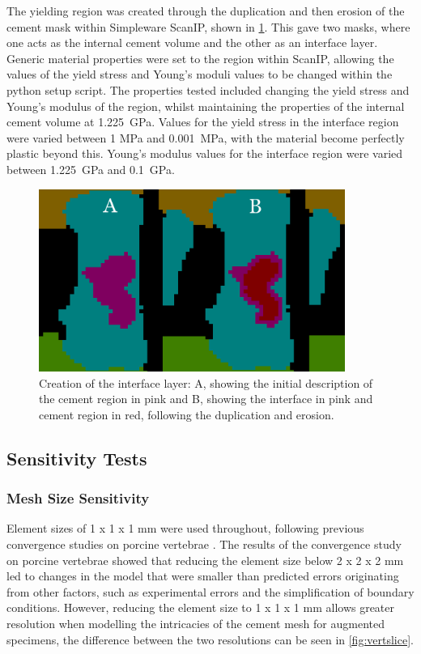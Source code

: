 The yielding region was created through the duplication and then erosion of the
cement mask within Simpleware ScanIP, shown in \cref{fig:interfacecreation}.
This gave two masks, where one acts as the internal cement volume and the other
as an interface layer.  Generic material properties were set to the region
within ScanIP, allowing the values of the yield stress and Young's moduli
values to be changed within the python setup script.  The properties tested
included changing the yield stress and Young's modulus of the region, whilst
maintaining the properties of the internal cement volume at 1.225~GPa.  Values
for the yield stress in the interface region were varied between 1 MPa and
0.001~MPa, with the material become perfectly plastic beyond this.  Young's
modulus values for the interface region were varied between 1.225~GPa and
0.1~GPa.

\begin{figure}[ht!]
\centering
\includegraphics[width=10cm]{images/interface_creation.png}
\caption[Depiction of the yielding material interface creation]{Creation of the interface layer: A, showing the initial description of the cement region in pink and B, showing the interface in pink and cement region in red, following the duplication and erosion.}
\label{fig:interfacecreation}
\end{figure}

\subsection{Sensitivity Tests}\label{sensitivity-tests}

\subsubsection{Mesh Size Sensitivity}\label{mesh-size-sensitivity}

Element sizes of 1 x 1 x 1 mm were used throughout, following previous
convergence studies on porcine vertebrae \cite{Jones2007}. The results of the
convergence study on porcine vertebrae showed that reducing the element size
below 2 x 2 x 2 mm led to changes in the model that were smaller than predicted
errors originating from other factors, such as experimental errors and the
simplification of boundary conditions.  However, reducing the element size to 1
x 1 x 1 mm allows greater resolution when modelling the intricacies of the
cement mesh for augmented specimens, the difference between the two resolutions
can be seen in \cref{fig:vertslice}.


